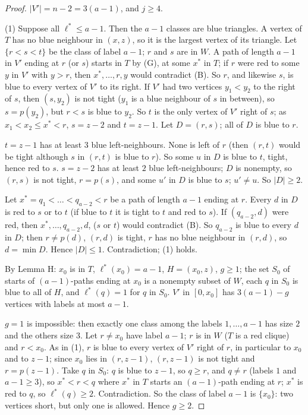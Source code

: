 \documentclass[11pt]{article}
\theoremstyle{plain}
\theoremstyle{remark}
\begin{document}
\begin{proof}
$|V'| = n - 2 = 3(a-1)$, and $j \geq 4$.

(1) Suppose all $\ell^* \leq a-1$. Then the $a-1$ classes are blue triangles. A vertex of $T$ has no blue neighbour
in $(x, z)$, so it is the largest vertex of its triangle. Let $\{r < s < t\}$ be the class of label $a-1$; $r$ and
$s$ are in $W$. A path of length $a-1$ in $V'$ ending at $r$ (or $s$) starts in $T$ by (G), at some $x^*$ in $T$;
if $r$ were red to some $y$ in $V'$ with $y > r$, then $x^*, \dots, r, y$ would contradict (B). So $r$, and likewise
$s$, is blue to every vertex of $V'$ to its right. If $V'$ had two vertices $y_1 < y_2$ to the right of $s$, then
$(s, y_2)$ is not tight ($y_1$ is a blue neighbour of $s$ in between), so $s = p(y_2)$, but $r < s$ is blue to
$y_2$. So $t$ is the only vertex of $V'$ right of $s$; as $x_1 < x_2 \leq x^* < r$, $s = z-2$ and $t = z-1$. Let
$D = (r, s)$; all of $D$ is blue to $r$.

$t = z-1$ has at least $3$ blue left-neighbours. None is left of $r$ (then $(r, t)$ would be tight although $s$ in
$(r, t)$ is blue to $r$). So some $u$ in $D$ is blue to $t$, tight, hence red to $s$. $s = z-2$ has at least $2$
blue left-neighbours; $D$ is nonempty, so $(r, s)$ is not tight, $r = p(s)$, and some $u'$ in $D$ is blue to $s$;
$u' \neq u$. So $|D| \geq 2$.

Let $x^* = q_1 < \dots < q_{a-2} < r$ be a path of length $a-1$ ending at $r$. Every $d$ in $D$ is red to $s$ or
to $t$ (if blue to $t$ it is tight to $t$ and red to $s$). If $(q_{a-2}, d)$ were red, then
$x^*, \dots, q_{a-2}, d$, ($s$ or $t$) would contradict (B). So $q_{a-2}$ is blue to every $d$ in $D$; then
$r \neq p(d)$, $(r, d)$ is tight, $r$ has no blue neighbour in $(r, d)$, so $d = \min D$. Hence $|D| \leq 1$.
Contradiction; (1) holds.

By Lemma H: $x_0$ is in $T$, $\ell^*(x_0) = a-1$, $H = (x_0, z)$, $g \geq 1$; the set $S_0$ of starts of
$(a-1)$-paths ending at $x_0$ is a nonempty subset of $W$, each $q$ in $S_0$ is blue to all of $H$, and
$\ell^*(q) = 1$ for $q$ in $S_0$. $V'$ in $[0, x_0]$ has $3(a-1) - g$ vertices with labels at most $a-1$.

$g = 1$ is impossible: then exactly one class among the labels $1, \dots, a-1$ has size $2$ and the others size
$3$. Let $r \neq x_0$ have label $a-1$; $r$ is in $W$ ($T$ is a red clique) and $r < x_0$. As in (1), $r$ is blue
to every vertex of $V'$ right of $r$, in particular to $x_0$ and to $z-1$; since $x_0$ lies in $(r, z-1)$,
$(r, z-1)$ is not tight and $r = p(z-1)$. Take $q$ in $S_0$: $q$ is blue to $z-1$, so $q \geq r$, and $q \neq r$
(labels $1$ and $a-1 \geq 3$), so $x^* < r < q$ where $x^*$ in $T$ starts an $(a-1)$-path ending at $r$; $x^*$ is
red to $q$, so $\ell^*(q) \geq 2$. Contradiction. So the class of label $a-1$ is $\{x_0\}$: two vertices short, but
only one is allowed. Hence $g \geq 2$.


\end{proof}
\end{document}
